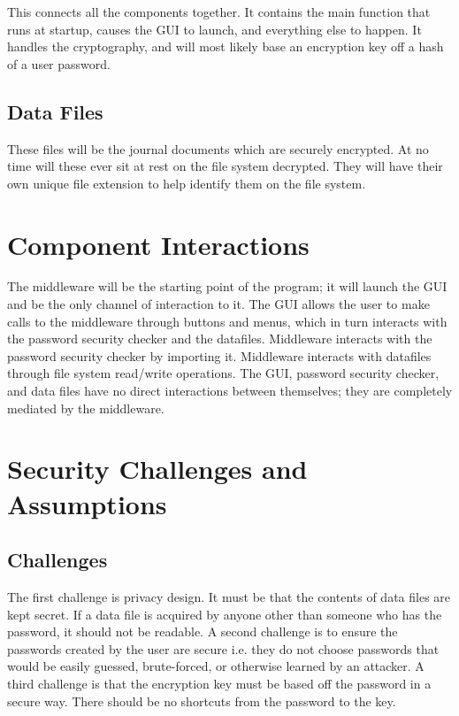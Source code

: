\documentclass[12pt, letterpaper]{article}
\begin{document}
This connects all the components together. It contains the main function that runs at startup, causes the GUI to launch, and everything else to happen. It handles the cryptography, and will most likely base an encryption key off a hash of a user password.

\subsection{Data Files}

These files will be the journal documents which are securely encrypted. At no time will these ever sit at rest on the file system decrypted. They will have their own unique file extension to help identify them on the file system.

\section{Component Interactions}

The middleware will be the starting point of the program; it will launch the GUI and be the only channel of interaction to it. The GUI allows the user to make calls to the middleware through buttons and menus, which in turn interacts with the password security checker and the datafiles. Middleware interacts with the password security checker by importing it. Middleware interacts with datafiles through file system read/write operations.
The GUI, password security checker, and data files have no direct interactions between themselves; they are completely mediated by the middleware.

\section{Security Challenges and Assumptions}

\subsection{Challenges}
The first challenge is privacy design. It must be that the contents of data files are kept secret. If a data file is acquired by anyone other than someone who has the password, it should not be readable. A second challenge is to ensure the passwords created by the user are secure i.e. they do not choose passwords that would be easily guessed, brute-forced, or otherwise learned by an attacker. A third challenge is that the encryption key must be based off the password in a secure way. There should be no shortcuts from the password to the key.
\end{document}
